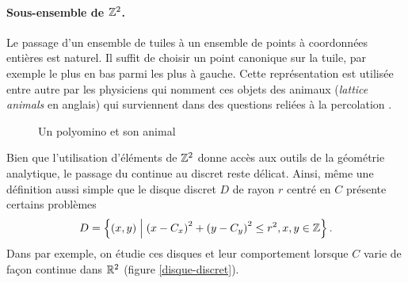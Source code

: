 \vspace{-24pt}
\paragraph{\bf Sous-ensemble de $\mathbb{Z}^2$.}
Le passage d'un ensemble de tuiles à un ensemble de points à coordonnées entières est naturel. Il suffit de choisir un point canonique sur la tuile, par exemple le plus en bas parmi les plus à gauche. Cette représentation est utilisée entre autre par les physiciens qui nomment ces objets des animaux (\emph{lattice animals} en anglais) \cite{Lubensky79, C3SM52805G} qui surviennent dans des questions reliées à la percolation \cite{KM}.
\begin{figure}[H]
\centering
\shorthandoff{:}
\caption{Un polyomino et son animal}
\end{figure}

Bien que l'utilisation d'éléments de $\mathbb{Z}^2$ donne accès aux outils de la géométrie analytique, le passage du continue au discret reste délicat. Ainsi, même une définition aussi simple que le disque discret $D$ de rayon $r$ centré en $C$ présente certains problèmes
\[
D = \left \{ (x,y) \mathrel{}\middle|\mathrel{} {(x-C_x)}^2+{(y-C_y)}^2 \leq r^2, x,y \in \mathbb{Z}\right\}.
\]
Dans \cite{inertia} par exemple, on étudie ces disques et leur comportement lorsque $C$ varie de façon continue dans $\mathbb{R}^2$ (figure \ref{disque-discret}).

